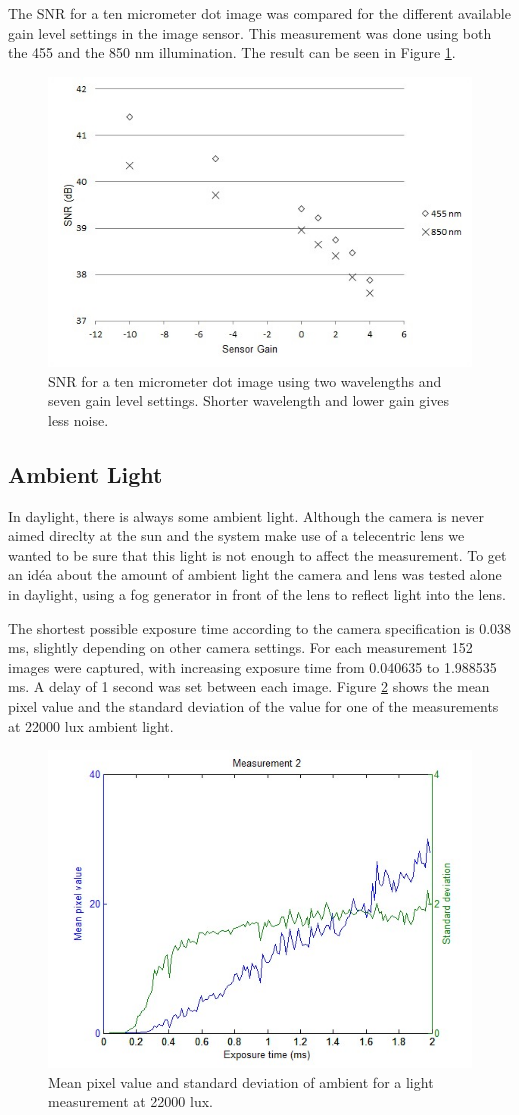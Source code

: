 The SNR for a ten micrometer dot image was compared for the different available gain level settings in the image sensor. This measurement was done using both the 455 and the 850 nm illumination. The result can be seen in Figure \ref{fig:noisegain}.

\begin{figure}%
\centering\includegraphics[width=0.6\linewidth]{figures/NoiseGain}
\caption{SNR for a ten micrometer dot image using two wavelengths and seven gain level settings. Shorter wavelength and lower gain gives less noise.}
\label{fig:noisegain}
\end{figure}

\subsection{Ambient Light}

In daylight, there is always some ambient light. Although the camera is never aimed direclty at the sun and the system make use of a telecentric lens we wanted to be sure that this light is not enough to affect the measurement. To get an idéa about the amount of ambient light the camera and lens was tested alone in daylight, using a fog generator in front of the lens to reflect light into the lens. 

The shortest possible exposure time according to the camera specification is 0.038 ms, slightly depending on other camera settings. For each measurement 152 images were captured, with increasing exposure time from 0.040635 to 1.988535 ms. A delay of 1 second was set between each image. Figure \ref{fig:ambientlight} shows the mean pixel value and the standard deviation of the value for one of the measurements at 22000 lux ambient light.

\begin{figure}%
\centering\includegraphics[width=0.6\linewidth]{figures/Amblight22000lux}
\caption{Mean pixel value and standard deviation of ambient for a light measurement at 22000 lux.}
\label{fig:ambientlight}
\end{figure}

